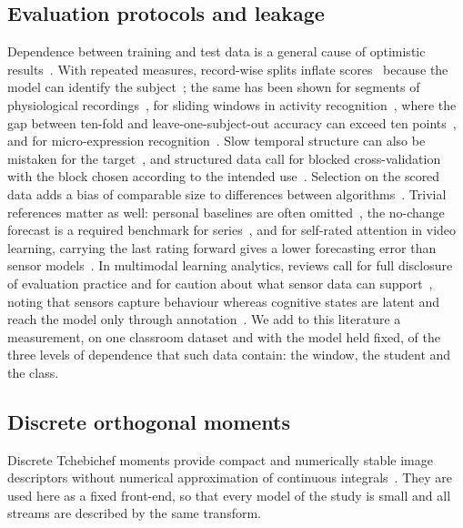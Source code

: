 \subsection{Evaluation protocols and leakage}
Dependence between training and test data is a general cause of optimistic results~\cite{kapoor2023leakage}. With repeated measures, record-wise splits inflate scores~\cite{saeb2017need} because the model can identify the subject~\cite{chaibubneto2019detecting}; the same has been shown for segments of physiological recordings~\cite{brookshire2024data,pandilova2026participant}, for sliding windows in activity recognition~\cite{hammerla2015lets,tello2023too}, where the gap between ten-fold and leave-one-subject-out accuracy can exceed ten points~\cite{gholamiangonabadi2020deep}, and for micro-expression recognition~\cite{varanka2024data}. Slow temporal structure can also be mistaken for the target~\cite{li2020perils}, and structured data call for blocked cross-validation with the block chosen according to the intended use~\cite{roberts2017cross}. Selection on the scored data adds a bias of comparable size to differences between algorithms~\cite{cawley2010overfitting}. Trivial references matter as well: personal baselines are often omitted~\cite{demasi2017meaningless}, the no-change forecast is a required benchmark for series~\cite{hewamalage2023forecast}, and for self-rated attention in video learning, carrying the last rating forward gives a lower forecasting error than sensor models~\cite{leng2026edugage}. In multimodal learning analytics, reviews call for full disclosure of evaluation practice and for caution about what sensor data can support~\cite{worsley2021new,yan2022scalability,cukurova2020promise}, noting that sensors capture behaviour whereas cognitive states are latent and reach the model only through annotation~\cite{dimitri2018signals}. We add to this literature a measurement, on one classroom dataset and with the model held fixed, of the three levels of dependence that such data contain: the window, the student and the class.

\subsection{Discrete orthogonal moments}
Discrete Tchebichef moments provide compact and numerically stable image descriptors without numerical approximation of continuous integrals~\cite{mukundan2001tchebichef}. They are used here as a fixed front-end, so that every model of the study is small and all streams are described by the same transform.
